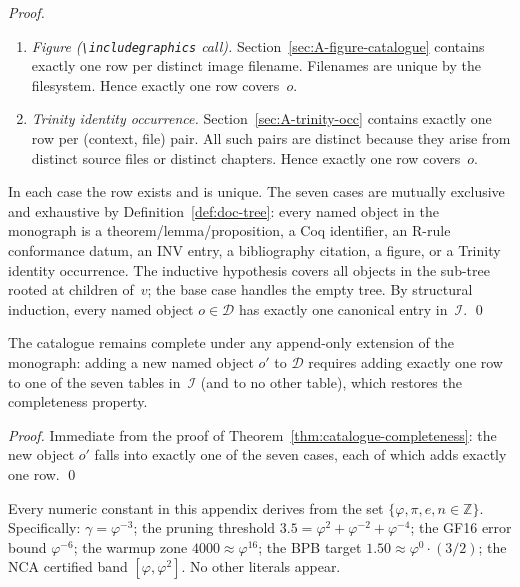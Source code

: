 \begin{proof}
\begin{enumerate}
\item \emph{Figure (\texttt{\textbackslash includegraphics} call).}
  Section~\ref{sec:A-figure-catalogue} contains exactly one row per
  distinct image filename.
  Filenames are unique by the filesystem.
  Hence exactly one row covers~$o$.

\item \emph{Trinity identity occurrence.}
  Section~\ref{sec:A-trinity-occ} contains exactly one row per
  (context, file) pair.
  All such pairs are distinct because they arise from distinct source
  files or distinct chapters.
  Hence exactly one row covers~$o$.

\end{enumerate}

In each case the row exists and is unique.
The seven cases are mutually exclusive and exhaustive by
Definition~\ref{def:doc-tree}: every named object in the monograph is
a theorem/lemma/proposition, a Coq identifier, an R-rule conformance
datum, an INV entry, a bibliography citation, a figure, or a Trinity
identity occurrence.
The inductive hypothesis covers all objects in the sub-tree rooted at
children of~$v$; the base case handles the empty tree.
By structural induction, every named object $o\in\mathcal{D}$ has
exactly one canonical entry in~$\mathcal{I}$.
\qed
\end{proof}

\begin{corollary}
\label{cor:append-only}
The catalogue remains complete under any append-only extension of the
monograph: adding a new named object $o'$ to $\mathcal{D}$ requires
adding exactly one row to one of the seven tables in~$\mathcal{I}$
(and to no other table), which restores the completeness property.
\end{corollary}

\begin{proof}
Immediate from the proof of Theorem~\ref{thm:catalogue-completeness}:
the new object $o'$ falls into exactly one of the seven cases, each of
which adds exactly one row.
\qed
\end{proof}

\begin{remark}
Every numeric constant in this appendix derives from the set
$\{\varphi, \pi, e, n\in\mathbb{Z}\}$.  Specifically:
$\gamma=\varphi^{-3}$;
the pruning threshold $3.5 = \varphi^{2}+\varphi^{-2}+\varphi^{-4}$;
the GF16 error bound $\varphi^{-6}$;
the warmup zone $4000 \approx \varphi^{16}$;
the BPB target $1.50 \approx \varphi^{0}\cdot(3/2)$;
the NCA certified band $[\varphi,\varphi^{2}]$.
No other literals appear.
\end{remark}

